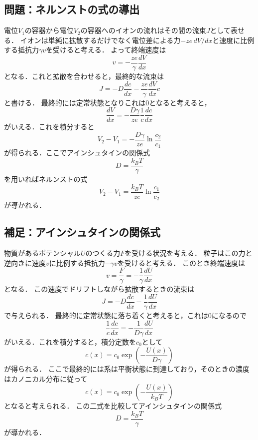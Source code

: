 \documentclass[a4paper,11pt]{jsarticle}
\begin{document}
\subsection{問題：ネルンストの式の導出}
電位$V_1$の容器から電位$V_2$の容器へのイオンの流れはその間の流束$J$として表せる．
イオンは単純に拡散するだけでなく電位差による力$-ze\,dV/dx$と速度に比例する抵抗力$\gamma v$を受けると考える．
よって終端速度は
\begin{equation}
  v = -\frac{ze}{\gamma} \frac{dV}{dx}
\end{equation}
となる．これと拡散を合わせると，最終的な流束は
\begin{equation}
  J = - D\frac{dc}{dx} - \frac{ze}{\gamma} \frac{dV}{dx} c
\end{equation}
と書ける．
最終的には定常状態となりこれは0となると考えると，
\begin{equation}
  \frac{dV}{dx} = -\frac{D\gamma}{ze}\frac{1}{c}\frac{dc}{dx}
\end{equation}
がいえる．これを積分すると
\begin{equation}
  V_2 - V_1 = -\frac{D\gamma}{ze}\ln{\frac{c_2}{c_1}}
\end{equation}
が得られる．ここでアインシュタインの関係式
\begin{equation}
  D = \frac{k_BT}{\gamma}
\end{equation}
を用いればネルンストの式
\begin{equation}
  V_2 - V_1 = \frac{k_BT}{ze}\ln{\frac{c_1}{c_2}}
\end{equation}
が導かれる．

\subsection{補足：アインシュタインの関係式}
物質があるポテンシャル$U$のつくる力$F$を受ける状況を考える．
粒子はこの力と逆向きに速度$v$に比例する抵抗力$-\gamma v$を受けると考える．
このとき終端速度は
\begin{equation}
  v = \frac{F}{\gamma} = - \frac{1}{\gamma}\frac{dU}{dx}
\end{equation}
となる．
この速度でドリフトしながら拡散するときの流束は
\begin{equation}
  J = -D\frac{dc}{dx} - \frac{1}{\gamma}\frac{dU}{dx}
\end{equation}
で与えられる．
最終的に定常状態に落ち着くと考えると，これは0になるので
\begin{equation}
  \frac{1}{c}\frac{dc}{dx} = -\frac{1}{D\gamma}\frac{dU}{dx} 
\end{equation}
がいえる．これを積分すると，積分定数を$c_0$として
\begin{equation}
  c(x) = c_0 \exp \left(-\frac{U(x)}{D\gamma}\right)
\end{equation}
が得られる．
ここで最終的には系は平衡状態に到達しており，そのときの濃度はカノニカル分布に従って
\begin{equation}
  c(x) = c_0 \exp \left(-\frac{U(x)}{k_BT} \right)
\end{equation}
となると考えられる．
この二式を比較してアインシュタインの関係式
\begin{equation}
  D = \frac{k_BT}{\gamma}
\end{equation}
が導かれる．
\end{document}
